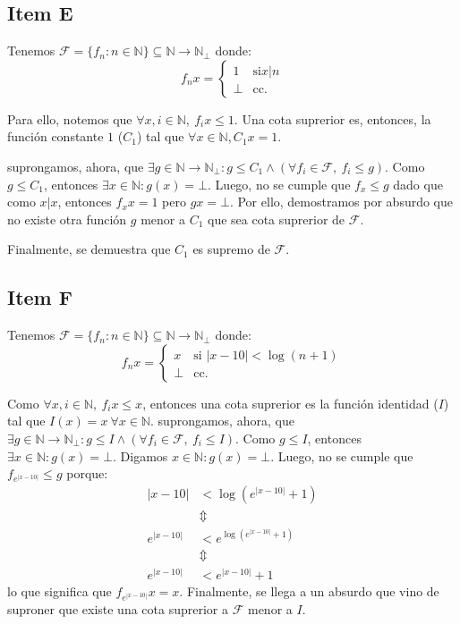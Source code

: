 \documentclass{article}
\newcommand{\N}{\mathbb{N}}
\begin{document}
\subsection*{Item E}
Tenemos $\mathcal{F} = \{f_n : n \in \N\} \subseteq \N \to \N_\bot$ donde:
\begin{equation*}
	f_n x = \begin{cases}
		1    & \text{si} x|n \\
		\bot & \text{cc.}
	\end{cases}
\end{equation*}

Para ello, notemos que $\forall x, i \in \N,\ f_i x \leq 1$.
Una cota suprerior es, entonces, la función constante $1$ ($C_1$) tal que $\forall x \in \N, C_1 x = 1$.

suprongamos, ahora, que $\exists g \in \N \to \N_\bot : g \leq C_1 \land (\forall f_i \in \mathcal{F},\ f_i \leq g)$.
Como $g \leq C_1$, entonces $\exists x \in \N : g(x) = \bot$.
Luego, no se cumple que $f_x \leq g$ dado que como $x|x$, entonces $f_x x = 1$ pero $g x = \bot$.
Por ello, demostramos por absurdo que no existe otra función $g$ menor a $C_1$ que sea cota suprerior de $\mathcal{F}$.

Finalmente, se demuestra que $C_1$ es supremo de $\mathcal{F}$.

\subsection*{Item F}
Tenemos $\mathcal{F} = \{f_n : n \in \N\} \subseteq \N \to \N_\bot$ donde:
\begin{equation*}
	f_n x = \begin{cases}
		x    & \text{si } |x-10| < \log(n + 1) \\
		\bot & \text{cc.}
	\end{cases}
\end{equation*}

Como $\forall x, i \in \N,\ f_i x \leq x$, entonces una cota suprerior es la función identidad ($I$) tal que $I(x) = x\ \forall x \in \N$.
suprongamos, ahora, que $\exists g \in \N \to \N_\bot : g \leq I \land (\forall f_i \in \mathcal{F},\ f_i \leq I)$.
Como $g \leq I$, entonces $\exists x \in \N : g(x) = \bot$.
Digamos $x \in \N : g(x) = \bot$.
Luego, no se cumple que $f_{e^{|x-10|}} \leq g$ porque:
\begin{equation*}
	\begin{aligned}
		|x-10|     & < \log(e^{|x-10|} + 1)     \\
		           & \Updownarrow               \\
		e^{|x-10|} & < e^{\log(e^{|x-10|} + 1)} \\
		           & \Updownarrow               \\
		e^{|x-10|} & < e^{|x-10|} + 1
	\end{aligned}
\end{equation*}
lo que significa que $f_{e^{|x-10|}} x = x$.
Finalmente, se llega a un absurdo que vino de suproner que existe una cota suprerior a $\mathcal{F}$ menor a $I$.
\end{document}
